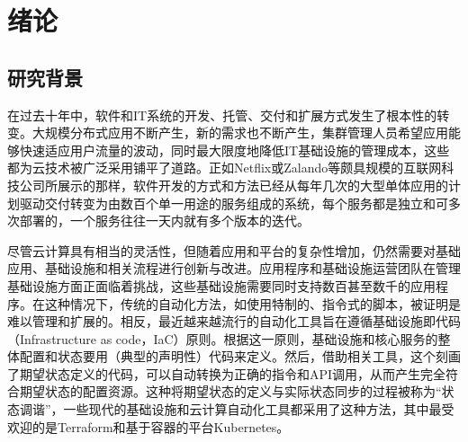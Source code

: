 \documentclass[macfonts,master]{njuthesis}
\begin{document}
\tableofcontents

\listoffigures

\listoftables

\mainmatter

\chapter{绪论}\label{chapter_introduction}
\section{研究背景}

在过去十年中，软件和IT系统的开发、托管、交付和扩展方式发生了根本性的转变。大规模分布式应用不断产生，新的需求也不断产生，集群管理人员希望应用能够快速适应用户流量的波动，同时最大限度地降低IT基础设施的管理成本，这些都为云技术被广泛采用铺平了道路。正如Netflix或Zalando等颇具规模的互联网科技公司所展示的那样，软件开发的方式和方法已经从每年几次的大型单体应用的计划驱动交付转变为由数百个单一用途的服务组成的系统，每个服务都是独立和可多次部署的，一个服务往往一天内就有多个版本的迭代\cite{zalando}\cite{netflix}。

尽管云计算具有相当的灵活性，但随着应用和平台的复杂性增加，仍然需要对基础应用、基础设施和相关流程进行创新与改进。应用程序和基础设施运营团队在管理基础设施方面正面临着挑战，这些基础设施需要同时支持数百甚至数千的应用程序。在这种情况下，传统的自动化方法，如使用特制的、指令式的脚本，被证明是难以管理和扩展的。相反，最近越来越流行的自动化工具旨在遵循基础设施即代码（Infrastructure as code，IaC）原则。根据这一原则，基础设施和核心服务的整体配置和状态要用（典型的声明性）代码来定义。然后，借助相关工具，这个刻画了期望状态定义的代码，可以自动转换为正确的指令和API调用，从而产生完全符合期望状态的配置资源。这种将期望状态的定义与实际状态同步的过程被称为``状态调谐''，一些现代的基础设施和云计算自动化工具都采用了这种方法，其中最受欢迎的是Terraform和基于容器的平台Kubernetes。
\end{document}
